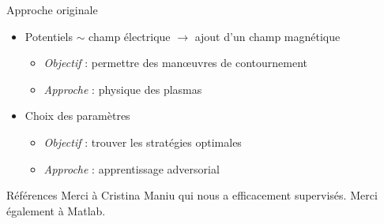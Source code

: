 \documentclass[final,hyperref={pdfpagelabels=false}]{beamer}
\begin{document}
\begin{frame}[t]
\begin{columns}[t]
\begin{column}{.465\textwidth}
{\begin{block}{{\Large Approche originale}}
\begin{itemize}
\item Potentiels $\sim$ champ \'electrique $\to$ ajout d'un champ magn\'etique
\begin{itemize}
\item \textit{Objectif} : permettre des man\oe uvres de contournement
\item \textit{Approche} : physique des plasmas
\end{itemize}
\item Choix des param\`etres
\begin{itemize}
\item \textit{Objectif} : trouver les strat\'egies optimales
\item \textit{Approche} : apprentissage adversorial
\end{itemize}
\end{itemize}

\end{block}
}


\begin{block}{{\Large R\'ef\'erences}}
Merci \`a Cristina Maniu qui nous a efficacement supervis\'es. Merci \'egalement \`a Matlab.

\end{block}


\end{column} %

\begin{column}{.015\textwidth}\end{column} %

\end{columns} %

\end{frame} %
\end{document}
